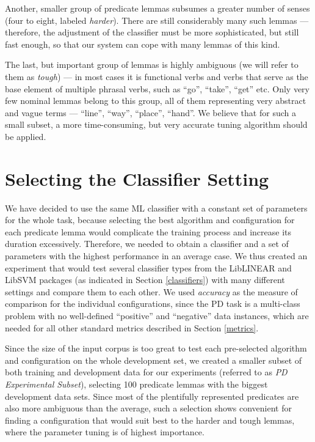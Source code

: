 \documentclass[12pt,notitlepage,a4paper]{report}
\begin{document}
Another, smaller group of predicate lemmas subsumes a greater number of senses (four to eight, labeled \emph{harder}). There are still considerably many such lemmas --- therefore, the adjustment of the classifier must be more sophisticated, but still fast enough, so that our system can cope with many lemmas of this kind.

The last, but important group of lemmas is highly ambiguous (we will refer to them as \emph{tough}) --- in most cases it is functional verbs and verbs that serve as the base element of multiple phrasal verbs, such as ``go'', ``take'', ``get'' etc. Only very few nominal lemmas belong to this group, all of them representing very abstract and vague terms --- ``line'', ``way'', ``place'', ``hand''. We believe that for such a small subset, a more time-consuming, but very accurate tuning algorithm should be applied.

\section{Selecting the Classifier Setting}\label{classifier-setting}

We have decided to use the same ML classifier with a constant set of parameters for the whole task, because selecting the best algorithm and configuration for each predicate lemma would complicate the training process and increase its duration excessively. Therefore, we needed to obtain a classifier and a set of parameters with the highest performance in an average case. We thus created an experiment that would test several classifier types from the LibLINEAR and LibSVM packages (as indicated in Section \ref{classifiers}) with many different settings and compare them to each other. We used \emph{accuracy} as the measure of comparison for the individual configurations, since the PD task is a multi-class problem with no well-defined ``positive'' and ``negative'' data instances, which are needed for all other standard metrics described in Section \ref{metrics}.

Since the size of the input corpus is too great to test each pre-selected algorithm and configuration on the whole development set, we created a smaller subset of both training and development data for our experiments (referred to as \emph{PD Experimental Subset}), selecting 100 predicate lemmas with the biggest development data sets. Since most of the plentifully represented predicates are also more ambiguous than the average, such a selection shows convenient for finding a configuration that would suit best to the harder and tough lemmas, where the parameter tuning is of highest importance.
\end{document}
